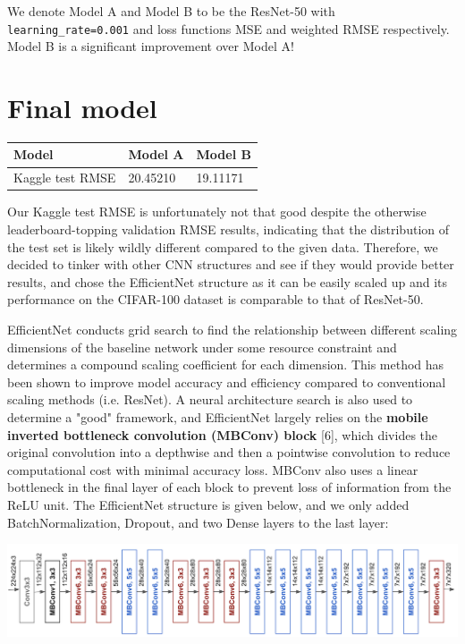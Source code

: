 \documentclass[12pt]{article}
\begin{document}
We denote Model A and Model B to be the ResNet-50 with \texttt{learning\_rate=0.001} and loss functions MSE and weighted RMSE respectively. Model B is a significant improvement over Model A!

\section{Final model}

\begin{center}
\begin{tabular}{ | m{5cm} | m{3cm}| m{3cm} | } 
  \hline
  Model & Model A & Model B \\ 
  \hline
  Kaggle test RMSE & 20.45210 & 19.11171 \\ 
  \hline
\end{tabular}
\end{center}

Our Kaggle test RMSE is unfortunately not that good despite the otherwise leaderboard-topping validation RMSE results, indicating that the distribution of the test set is likely wildly different compared to the given data. Therefore, we decided to tinker with other CNN structures and see if they would provide better results, and chose the EfficientNet structure as it can be easily scaled up and its performance on the CIFAR-100 dataset is comparable to that of ResNet-50.\newline

EfficientNet conducts grid search to find the relationship between different scaling dimensions of the baseline network under some resource constraint and determines a compound scaling coefficient for each dimension. This method has been shown to improve model accuracy and efficiency compared to conventional scaling methods (i.e. ResNet). A neural architecture search is also used to determine a "good" framework, and EfficientNet largely relies on the \textbf{mobile inverted bottleneck convolution (MBConv) block} [6], which divides the original convolution into a depthwise and then a pointwise convolution to reduce computational cost with minimal accuracy loss. MBConv also uses a linear bottleneck in the final layer of each block to prevent loss of information from the ReLU unit. The EfficientNet structure is given below, and we only added BatchNormalization, Dropout, and two Dense layers to the last layer:

\includegraphics[scale=0.3]{8_efficientnet}
\end{document}
